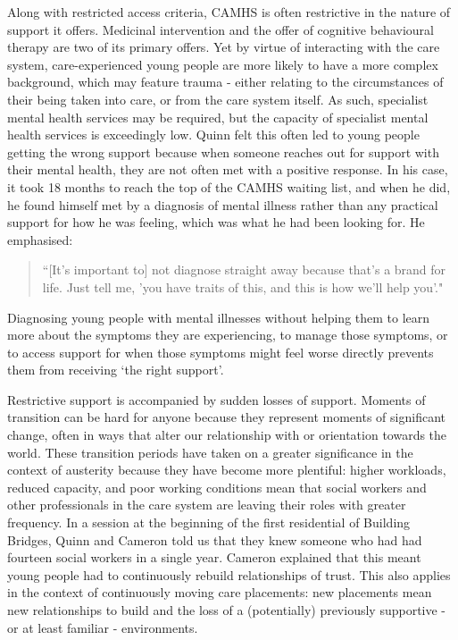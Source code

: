 Along with restricted access criteria, CAMHS is often restrictive in the nature of support it offers. Medicinal intervention and the offer of cognitive behavioural therapy are two of its primary offers. Yet by virtue of interacting with the care system, care-experienced young people are more likely to have a more complex background, which may feature trauma - either relating to the circumstances of their being taken into care, or from the care system itself. As such, specialist mental health services may be required, but the capacity of specialist mental health services is exceedingly low. Quinn felt this often led to young people getting the wrong support because when someone reaches out for support with their mental health, they are not often met with a positive response. In his case, it took 18 months to reach the top of the CAMHS waiting list, and when he did, he found himself met by a diagnosis of mental illness rather than any practical support for how he was feeling, which was what he had been looking for. He emphasised:
\begin{quote}
“[It’s important to] not diagnose straight away because that's a brand for life. Just tell me, 'you have traits of this, and this is how we'll help you'."
\end{quote}
Diagnosing young people with mental illnesses without helping them to learn more about the symptoms they are experiencing, to manage those symptoms, or to access support for when those symptoms might feel worse directly prevents them from receiving ‘the right support’.

Restrictive support is accompanied by sudden losses of support. Moments of transition can be hard for anyone because they represent moments of significant change, often in ways that alter our relationship with or orientation towards the world. These transition periods have taken on a greater significance in the context of austerity because they have become more plentiful: higher workloads, reduced capacity, and poor working conditions mean that social workers and other professionals in the care system are leaving their roles with greater frequency. In a session at the beginning of the first residential of Building Bridges, Quinn and Cameron told us that they knew someone who had had fourteen social workers in a single year. Cameron explained that this meant young people had to continuously rebuild relationships of trust. This also applies in the context of continuously moving care placements: new placements mean new relationships to build and the loss of a (potentially) previously supportive - or at least familiar - environments.

